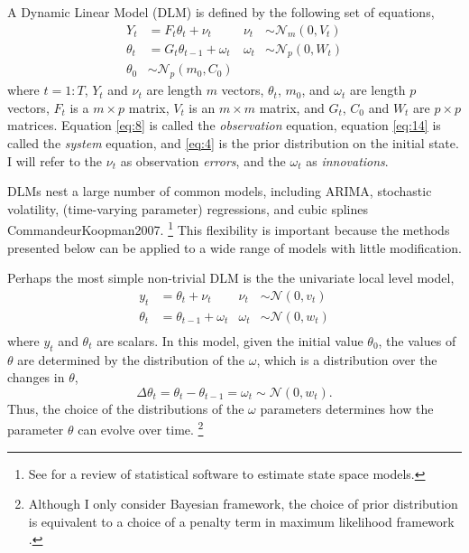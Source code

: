 \documentclass{article}
\newcommand{\paren}[1]{\ensuremath{\left(#1\right)}}
\newcommand{\dnorm}[1]{\ensuremath{\mathcal{N}\paren{#1}}}
\newcommand{\dmvnorm}[2]{\ensuremath{\mathcal{N}_{#2}\paren{#1}}}
\begin{document}
A Dynamic Linear Model (DLM) is defined by the following set of equations,
\begin{align}
  \label{eq:8}
  Y_t &= F_{t} \theta_t + \nu_t & \nu_{t} &\sim \dmvnorm{0, V_{t}}{m} \\
  \label{eq:14}
  \theta_t &= G_{t} \theta_{t-1} + \omega_{t} & \omega_{t} &\sim \dmvnorm{0, W_{t}}{p} \\
  \label{eq:2}
  \theta_{0} & \sim \dmvnorm{m_{0}, C_{0}}{p}
\end{align}  
where $t = 1:T$, 
$Y_{t}$ and $\nu_{t}$ are length $m$ vectors,
$\theta_{t}$, $m_{0}$, and $\omega_{t}$ are length $p$ vectors,
$F_{t}$ is a $m \times p$ matrix, 
$V_{t}$ is an $m \times m$ matrix,
and $G_{t}$, $C_{0}$ and $W_{t}$ are $p \times p$ matrices.
Equation \eqref{eq:8} is called the \textit{observation} equation, 
equation \eqref{eq:14} is called the \textit{system} equation,
and \eqref{eq:4} is the prior distribution on the initial state.
I will refer to the $\nu_{t}$ as observation \textit{errors}, and the $\omega_{t}$ as \textit{innovations}.

DLMs nest a large number of common models, including ARIMA, stochastic volatility, (time-varying parameter) regressions,
and cubic splines \parencites{WestHarrison1997}{DurbinKoopman2001}\parencite{PetrisPetroneEtAl2009}{CommandeurKoopman2007}.%
\footnote{See \textcite{CommandeurKoopmanOoms2011} for a review of statistical software to estimate state space models.}
This flexibility is important because the methods presented below can be applied to a wide range of models with little modification.

Perhaps the most simple non-trivial DLM is the the univariate local level model,
\begin{align}
  \label{eq:15}
  y_t &= \theta_t + \nu_t & \nu_{t} &\sim \dnorm{0, v_{t}} \\
  \label{eq:16}
  \theta_t &= \theta_{t-1} + \omega_{t} & \omega_{t} &\sim \dnorm{0, w_{t}} \\
\end{align}
where $y_{t}$ and $\theta_{t}$ are scalars.
In this model, given the initial value $\theta_{0}$, the values of $\theta$ are determined by the distribution of the $\omega$, which is a distribution over the changes in $\theta$,
\begin{equation}
  \label{eq:12}
  \Delta \theta_{t} = \theta_{t} - \theta_{t - 1} = \omega_{t} \sim \dnorm{0, w_{t}} \text{.}
\end{equation}
Thus, the choice of the distributions of the $\omega$ parameters determines how the parameter $\theta$ can evolve over time.%
\footnote{Although I only consider Bayesian framework, the choice of prior distribution is equivalent to a choice of a penalty term in maximum likelihood framework \parencite{PolsonScott2010}.}
\end{document}
